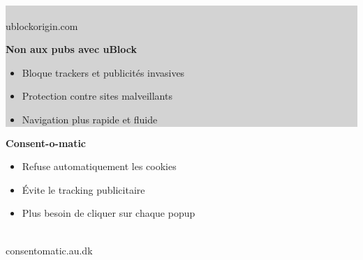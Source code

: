 \documentclass[a0paper,portrait]{baposter}
\begin{document}
\begin{poster}
{  \vspace{0.5em}

  \noindent
  \colorbox{lightgray}{
    \begin{minipage}[t]{0.25\linewidth}
      \centering
      \\
      \small{ublockorigin.com}
    \end{minipage}%
    \begin{minipage}[m]{0.7\linewidth}
      \textbf{\color{c4dtblue}Non aux pubs avec uBlock}
      \begin{itemize}
        \item Bloque trackers et publicités invasives
        \item Protection contre sites malveillants
        \item Navigation plus rapide et fluide
      \end{itemize}
    \end{minipage}
  }

  \vspace{0.5em}

  \noindent
  \begin{minipage}[m]{0.7\linewidth}
    \textbf{\color{c4dtblue}Consent-o-matic}
    \begin{itemize}
      \item Refuse automatiquement les cookies
      \item Évite le tracking publicitaire
      \item Plus besoin de cliquer sur chaque popup
    \end{itemize}
  \end{minipage}%
  \begin{minipage}[t]{0.25\linewidth}
    \centering
    \\
    \small{consentomatic.au.dk}
  \end{minipage}
}

  
  
  

\end{poster}
\end{document}

